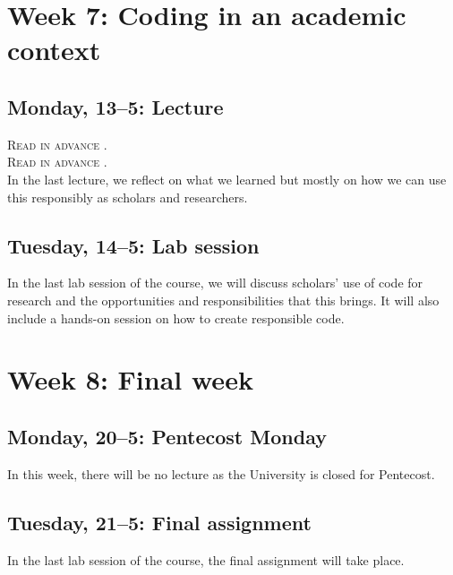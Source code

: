 \section*{Week 7: Coding in an academic context}

\subsection*{Monday, 13--5: Lecture}
\textsc{ Read in advance \cite{hube_understanding_2019}.} \\
\textsc{ Read in advance \cite{bender_dangers_2021}.} \\

In the last lecture, we reflect on what we learned but mostly on how we can use this responsibly as scholars and researchers. 

\subsection*{Tuesday, 14--5: Lab session}
In the last lab session of the course, we will discuss scholars' use of code for research and the opportunities and responsibilities that this brings. It will also include a hands-on session on how to create responsible code.

\section*{Week 8: Final week}

\subsection*{Monday, 20--5: Pentecost Monday}
In this week, there will be no lecture as the University is closed for Pentecost.

\subsection*{Tuesday, 21--5: Final assignment}
In the last lab session of the course, the final assignment will take place. 









